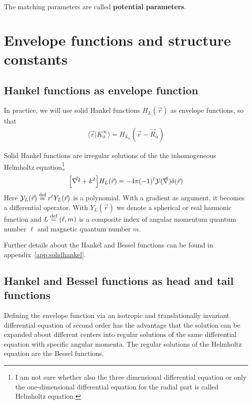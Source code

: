\documentclass[11pt,a4paper]{report}
\begin{document}
\begin{enumerate}
  The matching parameters are called \textbf{potential
    parameters}.
\end{enumerate}

\section{Envelope functions and structure constants}
\subsection{Hankel functions as envelope function}
In practice, we will use solid Hankel functions $H_L(\vec{r})$ as
envelope functions, so that 
\begin{eqnarray}
\langle\vec{r}|K^\infty_\alpha\rangle= H_{L_\alpha}(\vec{r}-\vec{R}_\alpha)
\end{eqnarray}


Solid Hankel functions are irregular solutions of the the
inhomogeneous Helmholtz equation\footnote{I am not sure whether also
  the three dimensional differential equation or only the
  one-dimensional differential equation for the radial part is called
  Helmholtz equation.}
\begin{eqnarray}
\Bigl[\vec{\nabla^2}+k^2\Bigr]H_{L}(\vec{r})
=-4\pi(-1)^\ell\mathcal{Y}(\vec{\nabla})\delta(\vec{r})
\label{eq:solidhelmholtzequation}
\end{eqnarray}
Here $\mathcal{Y}_L(\vec{r})\stackrel{\text{def}}{=} r^\ell Y_L(\vec{r})$ is a
polynomial. With a gradient as argument, it becomes a differential
operator. With $Y_L(\vec{r})$ we denote a spherical or real harmonic
function and $L\stackrel{\text{def}}{=}(\ell,m)$ is a composite index of angular
momentum quantum number $\ell$ and magnetic quantum number $m$.

Further details about the Hankel and Bessel functions can be found in
appendix~\ref{app:solidhankel}.

\subsection{Hankel and Bessel functions as head and tail functions}
Defining the envelope function via an isotropic and translationally
invariant differential equation of second order has the advantage
that the solution can be expanded about different centers into regular
solutions of the same differential equation with specific angular
momenta. The regular solutions of the Helmholtz equation are the
Bessel functions.
\end{document}
